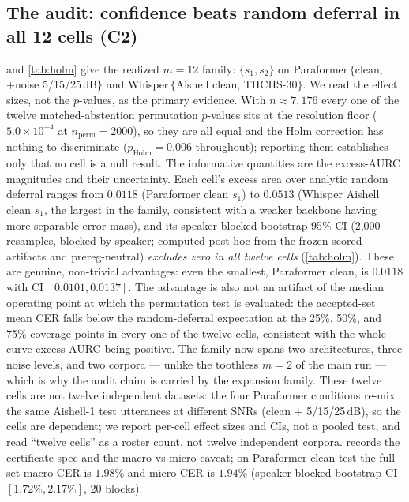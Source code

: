 \documentclass[11pt]{article}
\begin{document}
\subsection{The audit: confidence beats random deferral in all 12 cells (C2)}

 and \cref{tab:holm} give the realized $m=12$ family: $\{s_1,s_2\}$ on
Paraformer\,$\{$clean, +noise 5/15/25\,dB$\}$ and Whisper\,$\{$Aishell clean, THCHS-30$\}$.
We read the effect sizes, not the $p$-values, as the primary evidence. With
$n\approx7{,}176$ every one of the twelve matched-abstention permutation $p$-values sits at
the resolution floor ($5.0\times10^{-4}$ at $n_{\mathrm{perm}}=2000$), so they are all
equal and the Holm correction has nothing to discriminate ($p_{\mathrm{Holm}}=0.006$
throughout); reporting them establishes only that no cell is a null result. The informative
quantities are the excess-AURC magnitudes and their uncertainty. Each cell's excess area
over analytic random deferral ranges from $0.0118$ (Paraformer clean $s_1$) to $0.0513$
(Whisper Aishell clean $s_1$, the largest in the family, consistent with a weaker backbone
having more separable error mass), and
its speaker-blocked bootstrap 95\% CI (2{,}000 resamples, blocked by speaker; computed
post-hoc from the frozen scored artifacts and prereg-neutral) \emph{excludes zero in all
twelve cells} (\cref{tab:holm}). These are genuine, non-trivial advantages: even the
smallest, Paraformer clean, is $0.0118$ with CI $[0.0101, 0.0137]$. The advantage is also
not an artifact of the median operating point at which the permutation test is evaluated:
the accepted-set mean CER falls below the random-deferral expectation at the 25\%, 50\%, and
75\% coverage points in every one of the twelve cells, consistent with the whole-curve
excess-AURC being positive. The family now spans two architectures, three noise levels, and
two corpora --- unlike the toothless $m=2$ of the main run --- which is why the audit claim
is carried by the expansion family. These twelve cells are not twelve independent datasets:
the four Paraformer conditions re-mix the same Aishell-1 test utterances at different
SNRs (clean $+$ 5/15/25\,dB), so the cells are dependent; we report per-cell effect sizes and
CIs, not a pooled test, and read ``twelve cells'' as a roster count, not twelve independent
corpora.  records the certificate spec and the
macro-vs-micro caveat; on Paraformer clean test the full-set macro-CER is $1.98\%$ and
micro-CER is $1.94\%$ (speaker-blocked bootstrap CI $[1.72\%, 2.17\%]$, 20 blocks).
\end{document}
